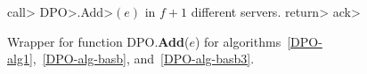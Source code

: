 \begin{figure}[ht]
	\begin{algorithm}[H]
    \caption{\small Wrapper for function DPO.\textbf{Add}($e$) for
algorithms~\ref{DPO-alg1},~\ref{DPO-alg-basb}, and~\ref{DPO-alg-basb3}.}
          \label{DPO-wAdd}
          \begin{algorithmic}[1]
        \State \<call> \<DPO>.\<Add>\((e)\) in \(f+1\) different servers.
			\State \<return> \<ack>
			\EndFunction
		\end{algorithmic}
	\end{algorithm}\vspace{-2em}
\end{figure}
